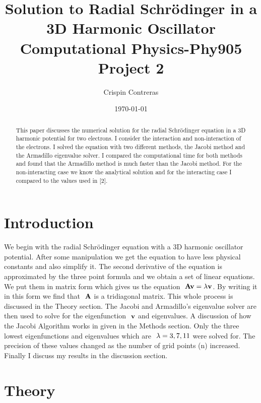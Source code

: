 \documentclass[11pt,a4wide]{article}
\begin{document}
\title{Solution to Radial Schr\"odinger in a 3D Harmonic Oscillator \break Computational Physics-Phy905 \break Project 2}
\author{Crispin Contreras}
\date{\today}
\maketitle


\begin{abstract}
This paper discusses the numerical solution for the radial Schr\"odinger equation in a 3D harmonic potential for two electrons. I consider the interaction and non-interaction of the electrons. I solved the equation with two different methods, the Jacobi method and the Armadillo eigenvalue solver. I compared the computational time for both methods and found that the Armadillo method is much faster than the Jacobi method. For the  non-interacting case we know the analytical solution and for the interacting case I compared to the values used in [2]. 
\end{abstract}



\section{Introduction}
We begin with the radial Schr\"odinger equation with a 3D harmonic oscillator potential. After some manipulation we get the equation to have less physical constants and also simplify it. The second derivative of the equation is approximated by the three point formula and we obtain a set of linear equations. We put them in matrix form which gives us the equation  $\ {\bf A}{\bf v} ={\bf \lambda}{\bf v}$. By writing it in this form we find that $\ {\bf A}$ is a tridiagonal matrix. This whole process is discussed in the Theory section. The Jacobi and Armadillo's eigenvalue solver are then used to solve for the eigenfunction $\ {\bf v}$ and eigenvalues. A discussion of how the Jacobi Algorithm works in given in the Methods section. Only the three lowest eigenfunctions and eigenvalues which are $\ {\bf \lambda} = 3,7,11$ were solved for. The precision of these values changed as the number of grid points (n) increased. Finally I discuss my results in the discussion section. 
\section{Theory}
\end{document}
